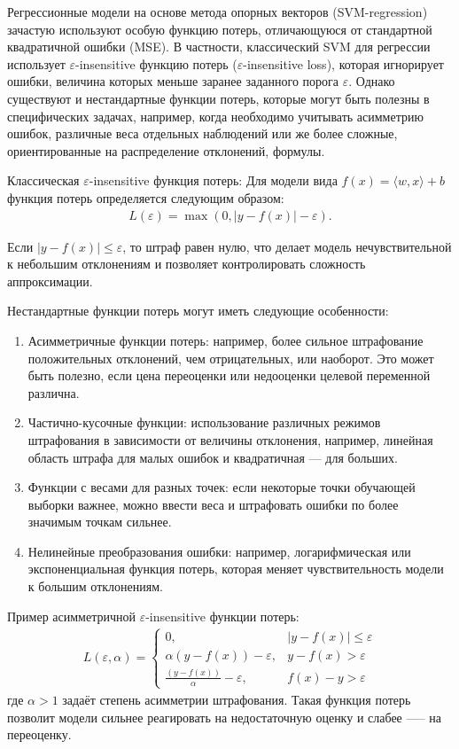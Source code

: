 Регрессионные модели на основе метода опорных векторов (SVM-regression) зачастую используют особую функцию потерь, отличающуюся от стандартной квадратичной ошибки (MSE). В частности, классический SVM для регрессии использует \(\varepsilon\)-insensitive функцию потерь (\(\varepsilon\)-insensitive loss), которая игнорирует ошибки, величина которых меньше заранее заданного порога \(\varepsilon\). Однако существуют и нестандартные функции потерь, которые могут быть полезны в специфических задачах, например, когда необходимо учитывать асимметрию ошибок, различные веса отдельных наблюдений или же более сложные, ориентированные на распределение отклонений, формулы.

Классическая \(\varepsilon\)-insensitive функция потерь:
Для модели вида \(f(x) = \langle w, x \rangle + b\) функция потерь определяется следующим образом:
\begin{align*}
L(\varepsilon) = \max(0, | y - f(x) | - \varepsilon).
\end{align*}

Если \(| y - f(x) | \leq \varepsilon\), то штраф равен нулю, что делает модель нечувствительной к небольшим отклонениям и позволяет контролировать сложность аппроксимации.

Нестандартные функции потерь могут иметь следующие особенности:

\begin{enumerate}
    \item Асимметричные функции потерь: например, более сильное штрафование положительных отклонений, чем отрицательных, или наоборот. Это может быть полезно, если цена переоценки или недооценки целевой переменной различна.
    \item Частично-кусочные функции: использование различных режимов штрафования в зависимости от величины отклонения, например, линейная область штрафа для малых ошибок и квадратичная — для больших.
    \item Функции с весами для разных точек: если некоторые точки обучающей выборки важнее, можно ввести веса и штрафовать ошибки по более значимым точкам сильнее.
    \item Нелинейные преобразования ошибки: например, логарифмическая или экспоненциальная функция потерь, которая меняет чувствительность модели к большим отклонениям.
\end{enumerate}

Пример асимметричной \(\varepsilon\)-insensitive функции потерь:
\begin{align*}
    L(\varepsilon, \alpha) = 
        \begin{cases}
            0, & | y - f(x) | \leq \varepsilon \\
            \alpha(y - f(x)) - \varepsilon, & y - f(x) > \varepsilon \\
            \frac{(y - f(x))}{\alpha} - \varepsilon, & f(x) - y > \varepsilon
        \end{cases}
\end{align*}
где \(\alpha > 1\) задаёт степень асимметрии штрафования. Такая функция потерь позволит модели сильнее реагировать на недостаточную оценку и слабее —-- на переоценку.

